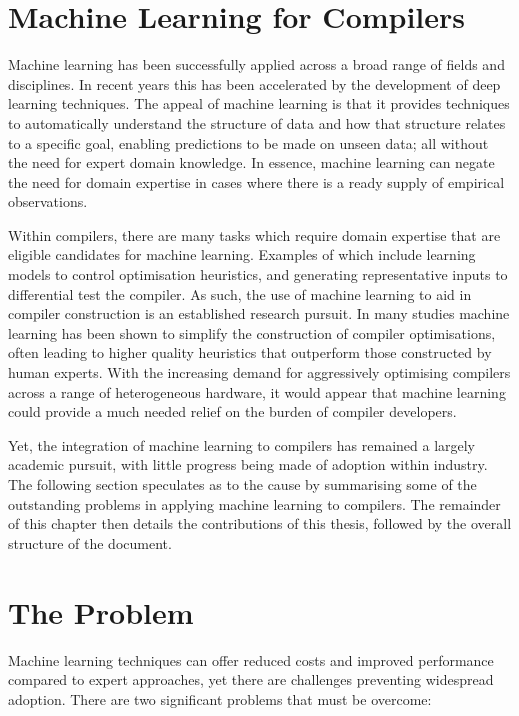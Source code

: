\section{Machine Learning for Compilers}

Machine learning has been successfully applied across a broad range of fields and disciplines. In recent years this has been accelerated by the development of deep learning techniques. The appeal of machine learning is that it provides techniques to automatically understand the structure of data and how that structure relates to a specific goal, enabling predictions to be made on unseen data; all without the need for expert domain knowledge. In essence, machine learning can negate the need for domain expertise in cases where there is a ready supply of empirical observations. 

Within compilers, there are many tasks which require domain expertise that are eligible candidates for machine learning. Examples of which include learning models to control optimisation heuristics, and generating representative inputs to differential test the compiler. As such, the use of machine learning to aid in compiler construction is an established research pursuit. In many studies machine learning has been shown to simplify the construction of compiler optimisations, often leading to higher quality heuristics that outperform those constructed by human experts. With the increasing demand for aggressively optimising compilers across a range of heterogeneous hardware, it would appear that machine learning could provide a much needed relief on the burden of compiler developers.

Yet, the integration of machine learning to compilers has remained a largely academic pursuit, with little progress being made of adoption within industry. The following section speculates as to the cause by summarising some of the outstanding problems in applying machine learning to compilers. The remainder of this chapter then details the contributions of this thesis, followed by the overall structure of the document.


\section{The Problem}

Machine learning techniques can offer reduced costs and improved performance compared to expert approaches, yet there are challenges preventing widespread adoption. There are two significant problems that must be overcome:

